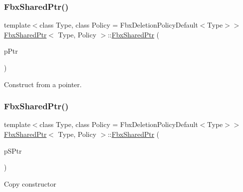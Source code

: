 \mbox{\label{class_fbx_shared_ptr_a694b2cfd410b1e18b87d697f30518af8}} 
\subsubsection{\texorpdfstring{Fbx\+Shared\+Ptr()}{FbxSharedPtr()}\hspace{0.1cm}{\footnotesize\ttfamily [2/3]}}
{\footnotesize\ttfamily template$<$class Type, class Policy = Fbx\+Deletion\+Policy\+Default$<$\+Type$>$$>$ \\
\hyperlink{class_fbx_shared_ptr}{Fbx\+Shared\+Ptr}$<$ Type, Policy $>$\+::\hyperlink{class_fbx_shared_ptr}{Fbx\+Shared\+Ptr} (\begin{DoxyParamCaption}\item[{Type $\ast$}]{p\+Ptr }\end{DoxyParamCaption})\hspace{0.3cm}{\ttfamily [explicit]}}



Construct from a pointer. 

\mbox{\label{class_fbx_shared_ptr_a7e6b1c33f8f837c6389ba99f88faafff}} 
\subsubsection{\texorpdfstring{Fbx\+Shared\+Ptr()}{FbxSharedPtr()}\hspace{0.1cm}{\footnotesize\ttfamily [3/3]}}
{\footnotesize\ttfamily template$<$class Type, class Policy = Fbx\+Deletion\+Policy\+Default$<$\+Type$>$$>$ \\
\hyperlink{class_fbx_shared_ptr}{Fbx\+Shared\+Ptr}$<$ Type, Policy $>$\+::\hyperlink{class_fbx_shared_ptr}{Fbx\+Shared\+Ptr} (\begin{DoxyParamCaption}\item[{const \hyperlink{class_fbx_shared_ptr}{Fbx\+Shared\+Ptr}$<$ Type, Policy $>$ \&}]{p\+S\+Ptr }\end{DoxyParamCaption})}



Copy constructor 

